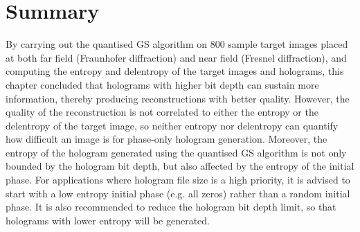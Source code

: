 \section{Summary}
	By carrying out the quantised GS algorithm on 800 sample target images placed at both far field (Fraunhofer diffraction) and near field (Fresnel diffraction), and computing the entropy and delentropy of the target images and holograms, this chapter concluded that holograms with higher bit depth can sustain more information, thereby producing reconstructions with better quality. However, the quality of the reconstruction is not correlated to either the entropy or the delentropy of the target image, so neither entropy nor delentropy can quantify how difficult an image is for phase-only hologram generation. Moreover, the entropy of the hologram generated using the quantised GS algorithm is not only bounded by the hologram bit depth, but also affected by the entropy of the initial phase. For applications where hologram file size is a high priority, it is advised to start with a low entropy initial phase (e.g. all zeros) rather than a random initial phase. It is also recommended to reduce the hologram bit depth limit, so that holograms with lower entropy will be generated.
